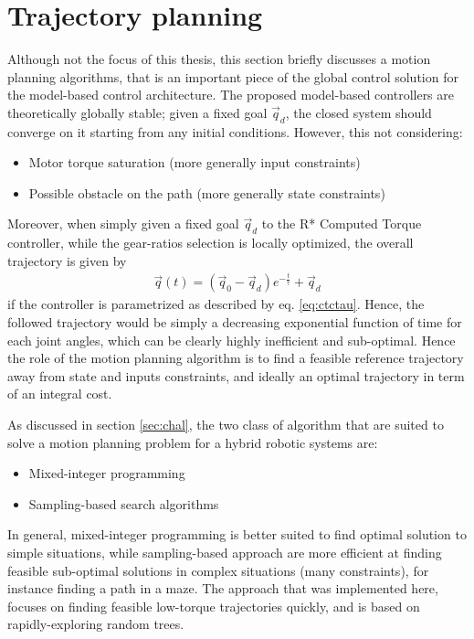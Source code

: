 \newpage
\section{Trajectory planning}
\label{sec:SamplingBasedTrajectoryPlanner}

Although not the focus of this thesis, this section briefly discusses a motion planning algorithms, that is an important piece of the global control solution for the model-based control architecture. The proposed model-based controllers are theoretically globally stable; given a fixed goal $\vec{q}_d$, the closed system should converge on it starting from any initial conditions. However, this not considering:
%
\begin{itemize}
	\item Motor torque saturation (more generally input constraints)
	\item Possible obstacle on the path (more generally state constraints)
\end{itemize}
%
Moreover, when simply given a fixed goal $\vec{q}_d$ to the R* Computed Torque controller, while the gear-ratios selection is locally optimized, the overall trajectory is given by 
%
\begin{align}
\vec{q}(t)   = (\vec{q}_0 - \vec{q}_d)  e^{-\frac{t}{\tau}} + \vec{q}_d
\end{align}
%
if the controller is parametrized as described by eq. \eqref{eq:ctctau}. Hence, the followed trajectory would be simply a decreasing exponential function of time for each joint angles, which can be clearly highly inefficient and sub-optimal. Hence the role of the motion planning algorithm is to find a feasible reference trajectory away from state and inputs constraints, and ideally an optimal trajectory in term of an integral cost. 

As discussed in section \ref{sec:chal}, the two class of algorithm that are suited to solve a motion planning problem for a hybrid robotic systems are:
%
\begin{itemize}
	\item Mixed-integer programming
	\item Sampling-based search algorithms
\end{itemize}
%
In general, mixed-integer programming is better suited to find optimal solution to simple situations, while sampling-based approach are more efficient at finding feasible sub-optimal solutions in complex situations (many constraints), for instance finding a path in a maze. The approach that was implemented here, focuses on finding feasible low-torque trajectories quickly, and is based on rapidly-exploring random trees.

